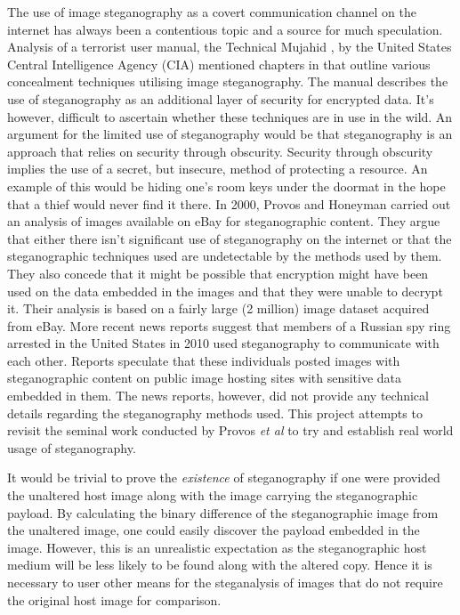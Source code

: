 \par The use of image steganography as a covert communication channel on the internet has always been a contentious topic and a source for much speculation. Analysis of a terrorist user manual, the Technical Mujahid \cite{alfajr}, by the United States Central Intelligence Agency (CIA) mentioned chapters in that outline various concealment techniques utilising image steganography. The manual describes the use of steganography as an additional layer of security for encrypted data. It's however, difficult to ascertain whether these techniques are in use in the wild. An argument for the limited use of steganography would be that steganography is an approach that relies on security through obscurity. Security through obscurity implies the use of a secret, but insecure, method of protecting a resource. An example of this would be hiding one's room keys under the doormat in the hope that a thief would never find it there. In 2000, Provos and Honeyman \cite{provos2001detecting}  carried out an analysis of images available on eBay for steganographic content.  They argue that either there isn't  significant use of steganography on the internet or that the steganographic techniques used are undetectable by the methods used by them. They also concede that it might be possible that encryption might have been used on the data embedded in the images and that they were unable to decrypt it. Their analysis is based on a fairly large (2 million) image dataset acquired from eBay.   More recent news reports  \cite{spies2010} suggest that members of a Russian spy ring arrested in the United States in 2010 used steganography to communicate with each other. Reports speculate that these individuals posted images with steganographic content on public image hosting sites with sensitive data embedded in them. The news reports, however, did not provide any technical details regarding the steganography methods used. This project attempts to revisit the seminal work conducted by Provos \emph{et al} to try and establish real world usage of steganography.

It would be trivial to prove the \emph{existence} of steganography if one were provided the unaltered host image along with the image carrying the steganographic payload. By calculating the binary difference of the steganographic image from the unaltered image, one could easily discover the payload embedded in the image. However, this is an unrealistic expectation as the steganographic host medium will be less likely to be found along with the altered copy. Hence it is necessary to user other means for the steganalysis of images that do not require the original host image for comparison.


